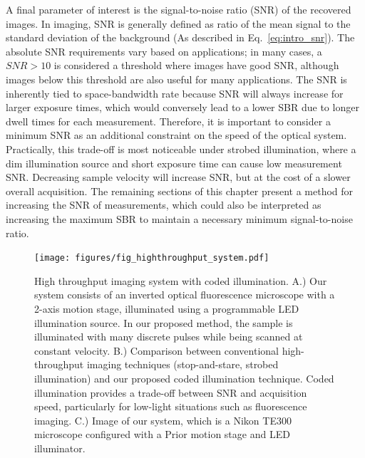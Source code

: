 A final parameter of interest is the signal-to-noise ratio (SNR) of the recovered images. In imaging, SNR is generally defined as ratio of the mean signal to the standard deviation of the background (As described in Eq.~\ref{eq:intro_snr}). The absolute SNR requirements vary based on applications; in many cases, a $SNR > 10$ is considered a threshold where images have good SNR, although images below this threshold are also useful for many applications. The SNR is inherently tied to space-bandwidth rate because SNR will always increase for larger exposure times, which would conversely lead to a lower SBR due to longer dwell times for each measurement. Therefore, it is important to consider a minimum SNR as an additional constraint on the speed of the optical system. Practically, this trade-off is most noticeable under strobed illumination, where a dim illumination source and short exposure time can cause low measurement SNR. Decreasing sample velocity will increase SNR, but at the cost of a slower overall acquisition. The remaining sections of this chapter present a method for increasing the SNR of measurements, which could also be interpreted as increasing the maximum SBR to maintain a necessary minimum signal-to-noise ratio.

\begin{figure}
  \centering
    \texttt{[image: figures/fig\_highthroughput\_system.pdf]}
  \caption{\label{fig:system}High throughput imaging system with coded illumination. A.) Our system consists of an inverted optical fluorescence microscope with a 2-axis motion stage, illuminated using a programmable LED illumination source. In our proposed method, the sample is illuminated with many discrete pulses while being scanned at constant velocity. B.) Comparison between conventional high-throughput imaging techniques (stop-and-stare, strobed illumination) and our proposed coded illumination technique. Coded illumination provides a trade-off between SNR and acquisition speed, particularly for low-light situations such as fluorescence imaging. C.) Image of our system, which is a Nikon TE300 microscope configured with a Prior motion stage and LED illuminator.}

\end{figure}

